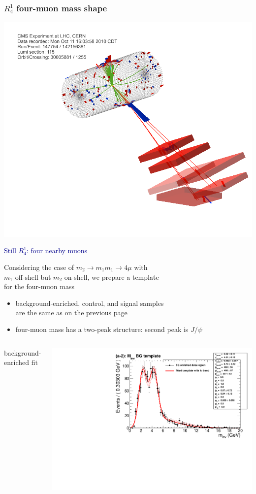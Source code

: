\documentclass[compress]{beamer}
\begin{document}
\begin{frame}
\frametitle{$R^1_4$ four-muon mass shape}

\hfill \includegraphics[height=3 cm]{quadmu_control_eventdisplay.png}

\vspace{-3 cm}
\textcolor{darkblue}{Still $R^1_4$: four nearby muons}

\vspace{0.25 cm}
Considering the case of $m_2 \to m_1 m_1 \to 4\mu$ with \\ $m_1$
off-shell but $m_2$ on-shell, we prepare a template \\ for the four-muon mass

\begin{itemize}
\item background-enriched, control, and signal samples \\ are the same as on the previous page
\item four-muon mass has a two-peak structure: second peak is $J/\psi$
\end{itemize}

\begin{columns}
\centering background-enriched fit

\includegraphics[width=\linewidth]{template__bkg_model_a2_inv__m_inv.pdf}


\end{columns}
\end{frame}
\end{document}
